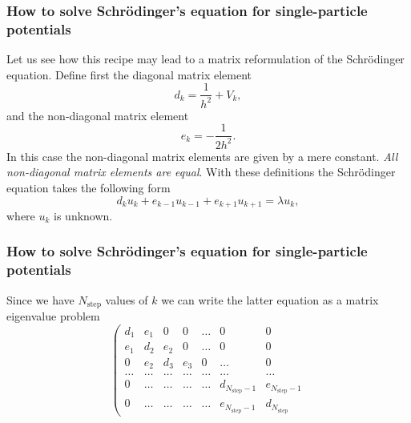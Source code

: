 \documentclass[compress]{beamer}
\begin{document}
\frame
{
  \frametitle{How to solve Schr\"odinger's equation for single-particle potentials}
\begin{small}
{\scriptsize
Let us see how this recipe may lead to a matrix reformulation of the 
Schr\"odinger equation.
Define first the diagonal matrix element
\[
   d_k=\frac{1}{h^2}+V_k,
\]
and the non-diagonal matrix element 
\[
   e_k=-\frac{1}{2h^2}.
\]
In this case the non-diagonal matrix elements are given by a mere constant.
{\em All non-diagonal matrix elements are equal}.
With these definitions the Schr\"odinger equation takes the following form
\[
d_ku_k+e_{k-1}u_{k-1}+e_{k+1}u_{k+1}  = \lambda u_k,
\]
where $u_k$ is unknown.
}
\end{small}
}


\frame
{
  \frametitle{How to solve Schr\"odinger's equation for single-particle potentials}
\begin{small}
{\scriptsize
 Since we have $N_{\mathrm{step}}$ values of $k$ we can write the 
latter equation as a matrix eigenvalue problem 
\begin{equation}
    \left( \begin{array}{ccccccc} d_1 & e_1 & 0   & 0    & \dots  &0     & 0 \\
                                e_1 & d_2 & e_2 & 0    & \dots  &0     &0 \\
                                0   & e_2 & d_3 & e_3  &0       &\dots & 0\\
                                \dots  & \dots & \dots & \dots  &\dots      &\dots & \dots\\
                                0   & \dots & \dots & \dots  &\dots       &d_{N_{\mathrm{step}}-1} & e_{N_{\mathrm{step}}-1}\\
                                0   & \dots & \dots & \dots  &\dots       &e_{N_{\mathrm{step}}-1} & d_{N_{\mathrm{step}}}


\end{array}
\end{equation}}
\end{small}}
\end{document}
